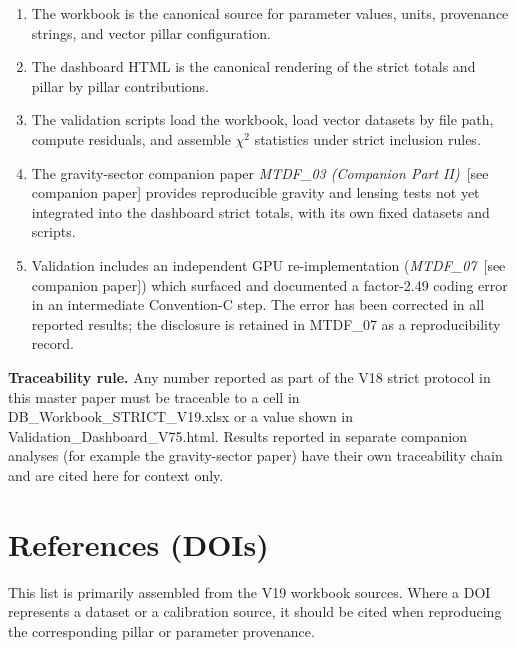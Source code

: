 \documentclass[11pt,a4paper]{article}
\begin{document}
\begin{enumerate}
  \item The workbook is the canonical source for parameter values, units, provenance strings, and vector pillar configuration.
  \item The dashboard HTML is the canonical rendering of the strict totals and pillar by pillar contributions.
  \item The validation scripts load the workbook, load vector datasets by file path, compute residuals, and assemble $\chi$$^{2}$ statistics under strict inclusion rules.
  \item The gravity-sector companion paper \textit{MTDF\_\allowbreak{}03 (Companion Part II)}~[see companion paper] provides reproducible gravity and lensing tests not yet integrated into the dashboard strict totals, with its own fixed datasets and scripts.
  \item Validation includes an independent GPU re-implementation (\textit{MTDF\_\allowbreak{}07}~[see companion paper]) which surfaced and documented a factor-2.49 coding error in an intermediate Convention-C step. The error has been corrected in all reported results; the disclosure is retained in MTDF\_\allowbreak{}07 as a reproducibility record.
\end{enumerate}

\begin{mdframed}[linecolor=accent,linewidth=0.5pt,backgroundcolor=callout-bg,leftline=true,rightline=true,topline=true,bottomline=true,innerleftmargin=8pt,innerrightmargin=8pt,innertopmargin=6pt,innerbottommargin=6pt]
\textbf{Traceability rule.} Any number reported as part of the V18 strict protocol in this master paper must be traceable to a cell in DB\_\allowbreak{}Workbook\_\allowbreak{}STRICT\_\allowbreak{}V19.xlsx or a value shown in Validation\_\allowbreak{}Dashboard\_\allowbreak{}V75.html. Results reported in separate companion analyses (for example the gravity-sector paper) have their own traceability chain and are cited here for context only.
\end{mdframed}

\section{References (DOIs)}
\label{sec:sec12}
This list is primarily assembled from the V19 workbook sources. Where a DOI represents a dataset or a calibration source, it should be cited when reproducing the corresponding pillar or parameter provenance.
\end{document}

